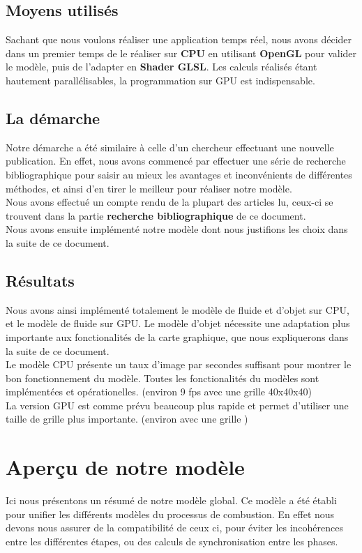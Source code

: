 \documentclass[a4paper,10pt]{article}
\begin{document}
\subsection{Moyens utilisés}
Sachant que nous voulons réaliser une application temps réel, nous avons décider dans 
un premier temps de le réaliser sur \textbf{CPU} en utilisant \textbf{OpenGL} pour valider le modèle, 
puis de l'adapter en \textbf{Shader GLSL}. Les calculs réalisés étant hautement 
parallélisables, la programmation sur GPU est indispensable.

\subsection{La démarche}
Notre démarche a été similaire à celle d'un chercheur effectuant une nouvelle
publication. En effet, nous avons commencé par effectuer une série de recherche
bibliographique pour saisir au mieux les avantages et inconvénients de différentes
méthodes, et ainsi d'en tirer le meilleur pour réaliser notre modèle.\\
Nous avons effectué un compte rendu de la plupart des articles lu, ceux-ci
se trouvent dans la partie \textbf{recherche bibliographique} de ce document.\\
Nous avons ensuite implémenté notre modèle dont nous justifions les choix
dans la suite de ce document.


\subsection{Résultats}
Nous avons ainsi implémenté totalement le modèle de fluide et d'objet sur CPU, 
et le modèle de fluide sur GPU. Le modèle d'objet nécessite une adaptation plus
importante aux fonctionalités de la carte graphique, que nous expliquerons 
dans la suite de ce document.\\
Le modèle CPU présente un taux d'image par secondes suffisant pour montrer 
le bon fonctionnement du modèle. Toutes les fonctionalités du modèles sont
implémentées et opérationelles. (environ 9 fps avec une grille 40x40x40)\\
La version GPU est comme prévu beaucoup plus rapide et permet d'utiliser
une taille de grille plus importante. (environ avec une grille )\\


\section{Aperçu de notre modèle}
Ici nous présentons un résumé de notre modèle global. Ce modèle a été
établi pour unifier les différents modèles du processus de combustion. 
En effet nous devons nous assurer de la compatibilité de ceux ci, pour éviter les incohérences entre les
différentes étapes, ou des calculs de synchronisation entre les
phases. 
\end{document}
